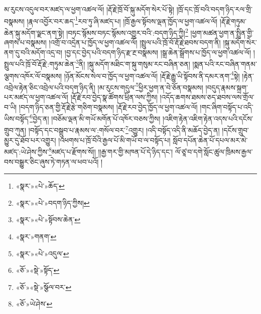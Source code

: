 མ་རུངས་འདུལ་བར་མཛད་ལ་ཕྱག་འཚལ་ལོ། །རྡོ་རྗེ་ཁྲོ་བོ་སྐུ་མདོག་སེར་པོ་སྟེ། །ཁྲོ་དང་ཁྲོ་བའི་བདག་ཉིད་རལ་གྲི་བསྣམས། །རྣལ་འབྱོར་བར་ཆད་\footnote{«སྣར་»«པེ་»ཆོད་}རབ་ཏུ་ཞི་མཛད་པ། །ཁྲོ་རྒྱལ་སྟོབས་ལྡན་ཁྱོད་ལ་ཕྱག་འཚལ་ལོ། །རྡོ་རྗེ་གཏུམ་ཆེན་སྐུ་མདོག་ལྗང་ནག་སྟེ། །བཏང་སྙོམས་བཏང་སྙོམས་འགྱུར་བའི་:བདག་ཉིད་ཀྱི།\footnote{«སྣར་»«པེ་»བདག་ཉིད་ཀྱིས།} །ཕྱག་མཚན་ཕྱག་ན་སྤྲིན་གྱི་ཞགས་པ་བསྣམས། །འགྲོ་བ་འདྲེན་པ་ཁྱོད་ལ་ཕྱག་འཚལ་ལོ། །སྤྲུལ་པའི་ཁྲོ་བོ་རྡོ་རྗེ་ཐབས་བདག་ནི། །སྐུ་མདོག་སེར་ནག་དུ་བའི་མདོག་འདྲ་བ། །བྱ་དང་བྱེད་པའི་བདག་ཉིད་རྫ་རྔ་བསྣམས། །སྒྲ་ཆེན་སྒྲོགས་པ་ཁྱོད་ལ་ཕྱག་འཚལ་ལོ། །སྤྲུལ་པའི་ཁྲོ་བོ་རྡོ་རྗེ་:གཏུམ་ཆེན་\footnote{«སྣར་»«པེ་»སྟོབས་ཆེན་}ནི། །སྐུ་མདོག་མཐིང་ག་སྐུ་གསུམ་རང་བཞིན་ཅན། །སྨན་པའི་རང་བཞིན་གནམ་ལྕགས་འཁོར་ལོ་བསྣམས། །ཉོན་མོངས་སེལ་བ་ཁྱོད་ལ་ཕྱག་འཚལ་ལོ། །རྡོ་རྗེ་རྒྱུ་ཡི་སྟོབས་ནི་དམར་ནག་\footnote{«སྣར་»གནག་}སྟེ། །རྟེན་འབྲེལ་རྟེན་ཅིང་འབྲེལ་པའི་བདག་ཉིད་ནི། །མ་རུངས་གདུལ་\footnote{«སྣར་»«པེ་»འདུལ་}ཕྱིར་ཕྱག་ན་བེ་ཅོན་བསྣམས། །བདུད་རྣམས་སྐྲག་པར་མཛད་ལ་ཕྱག་འཚལ་ལོ། །རྡོ་རྗེ་རབ་བྱེད་སྣ་ཚོགས་ཕྲིན་ལས་ཀྱིས། །འདོད་ཆགས་ཐམས་ཅད་ཐབས་ལས་གྲོལ་བ་ཡི། །བདག་ཉིད་ཅན་གྱི་རྡོ་རྗེ་རྩེ་གཅིག་བསྣམས། །རྡོ་རྗེ་རབ་བྱེད་ཁྱོད་ལ་ཕྱག་འཚལ་ལོ། །གང་ཞིག་བསྟོད་པ་འདི་ཡིས་བསྟོད་\footnote{«ཅོ་»«སྡེ་»སྟོད་}བྱེད་ན། །བཅོམ་ལྡན་མི་གཡོ་མགོན་པོ་འཁོར་བཅས་ཀྱིས། །འཇིག་རྟེན་འཇིག་རྟེན་འདས་པའི་དངོས་གྲུབ་ཀུན། །བསྟོད་དང་བསྒྲུབ་པ་རྣམས་ལ་:གསོལ་བར་\footnote{«ཅོ་»«སྡེ་»སྩོལ་བར་}འགྱུར། །འདི་བསྟོད་འདི་ནི་མཆོད་བྱེད་ན། །དངོས་གྲུབ་མྱུར་དུ་ཐོབ་པར་འགྱུར། །འཕགས་པ་ཁྲོ་བོའི་རྒྱལ་པོ་མི་གཡོ་བ་ལ་བསྟོད་པ། སློབ་དཔོན་ཆེན་པོ་དཔལ་མར་མེ་མཛད་:ཡེ་ཤེས་ཀྱིས་\footnote{«ཅོ་»ཡེ་ཤེས་}མཛད་པ་རྫོགས་སོ།། །།རྒྱ་གར་གྱི་མཁན་པོ་དེ་ཉིད་དང་། ལོ་ཙཱ་བ་དགེ་སློང་ཚུལ་ཁྲིམས་རྒྱལ་བས་བསྒྱུར་ཅིང་ཞུས་ཏེ་གཏན་ལ་ཕབ་པའོ། ། 